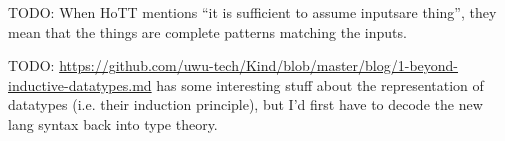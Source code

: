 \documentclass[11pt]{article} %
\theoremstyle{definition}
\theoremstyle{remark}
\begin{document}
TODO: When HoTT mentions ``it is sufficient to assume \guillemotleft inputs\guillemotright are \guillemotleft thing\guillemotright'', they mean that the things are complete patterns matching the inputs.

TODO: \url{https://github.com/uwu-tech/Kind/blob/master/blog/1-beyond-inductive-datatypes.md} has some interesting stuff about the representation of datatypes (i.e. their induction principle), but I'd first have to decode the new lang syntax back into type theory.

\printbibliography
\end{document}
